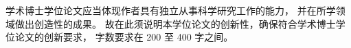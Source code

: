 

\begin{innovations}
  学术博士学位论文应当体现作者具有独立从事科学研究工作的能力，
  并在所学领域做出创造性的成果。
  故在此须说明本学位论文的创新性，确保符合学术博士学位论文的创新要求，
  字数要求在 200 至 400 字之间。
\end{innovations}


%
